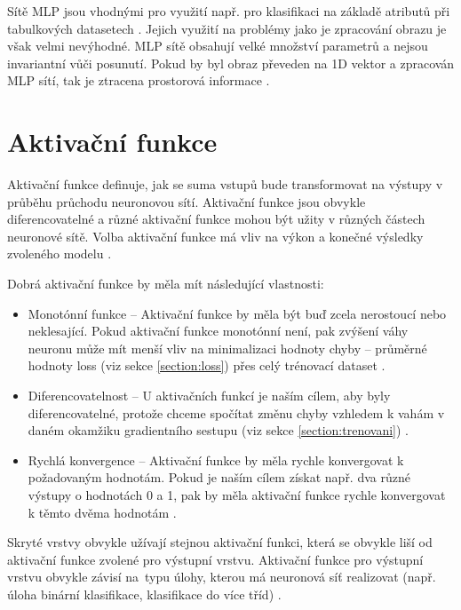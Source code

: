 Sítě MLP jsou vhodnými pro využití např. pro klasifikaci na základě atributů při tabulkových datasetech \cite{WhenToUseMLPCNN}. Jejich využití na problémy jako je zpracování obrazu je však velmi nevýhodné. MLP sítě obsahují velké množství parametrů a nejsou invariantní vůči posunutí. Pokud by byl obraz převeden na 1D vektor a zpracován MLP sítí, tak je ztracena prostorová informace \cite{CNNvsMLP}.





\section{Aktivační funkce}
Aktivační funkce definuje, jak se suma vstupů bude transformovat na výstupy v průběhu průchodu neuronovou sítí. Aktivační funkce jsou obvykle diferencovatelné a různé aktivační funkce mohou být užity v různých částech neuronové sítě. Volba aktivační funkce má vliv na výkon a konečné výsledky zvoleného modelu \cite{HowToChooseActivationFunction}. 

Dobrá aktivační funkce by měla mít následující vlastnosti:
\begin{itemize}
    \item Monotónní funkce -- Aktivační funkce by měla být buď zcela nerostoucí nebo neklesající. Pokud aktivační funkce monotónní není, pak zvýšení váhy neuronu může mít menší vliv na minimalizaci hodnoty chyby -- průměrné hodnoty loss (viz sekce \ref{section:loss}) přes celý trénovací dataset \cite{GoodActivationFunction}.
    \item Diferencovatelnost -- U aktivačních funkcí je naším cílem, aby byly diferencovatelné, protože chceme spočítat změnu chyby vzhledem k vahám v daném okamžiku gradientního sestupu (viz sekce \ref{section:trenovani}) \cite{GoodActivationFunction}.
    \item Rychlá konvergence -- Aktivační funkce by měla rychle konvergovat k požadovaným hodnotám. Pokud je naším cílem získat např. dva různé výstupy o hodnotách 0 a 1, pak by měla aktivační funkce rychle konvergovat k těmto dvěma hodnotám \cite{GoodActivationFunction}.
\end{itemize}

Skryté vrstvy obvykle užívají stejnou aktivační funkci, která se obvykle liší od aktivační funkce zvolené pro výstupní vrstvu. Aktivační funkce pro výstupní vrstvu obvykle závisí na~typu úlohy, kterou má neuronová síť realizovat (např. úloha binární klasifikace, klasifikace do více tříd) \cite{HowToChooseActivationFunction}.

